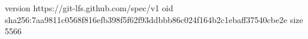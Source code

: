 version https://git-lfs.github.com/spec/v1
oid sha256:7aa9811c0568f816efb398f5f62f93ddbbb86c024f164b2c1ebaff37540cbe2e
size 5566
